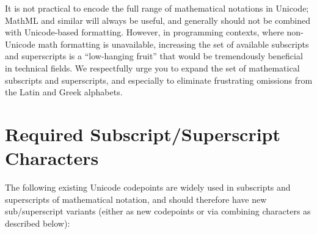\documentclass[10pt,english]{article}
\begin{document}
It is not practical to encode the full range of mathematical
notations in Unicode; MathML and similar will always be useful,
and generally should not be combined with Unicode-based formatting.
However, in programming contexts, where non-Unicode math formatting
is unavailable, increasing the set of available subscripts
and superscripts is a ``low-hanging fruit'' that would be tremendously
beneficial in technical fields. We respectfully urge you to expand the
set of mathematical subscripts and superscripts, and especially to
eliminate frustrating omissions from the Latin and Greek alphabets.


\section{Required Subscript/Superscript Characters}
\label{sec:required}

The following existing Unicode codepoints are widely used in subscripts and superscripts of mathematical notation, and should therefore have new sub/superscript variants (either as new codepoints or via combining characters as described below):
\end{document}
